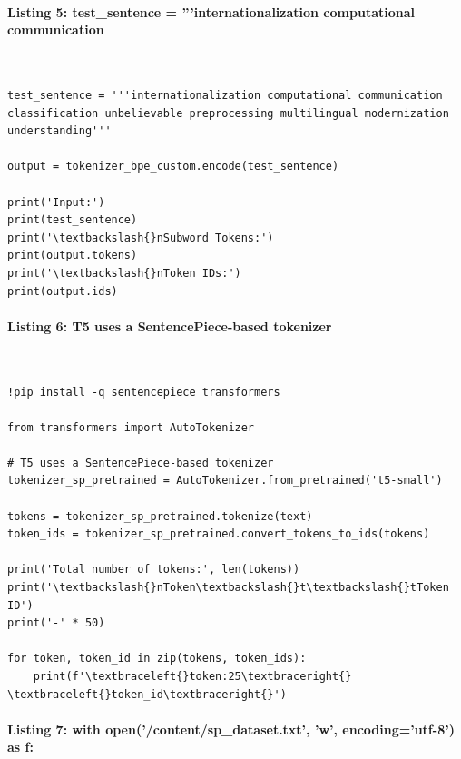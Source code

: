 \documentclass[12pt,a4paper,oneside]{report}
\begin{document}
\paragraph{Listing 5: test\_sentence = '''internationalization computational communication}\mbox{}\\[-1ex]
\begin{Verbatim}[commandchars=\\\{\},breaklines=true,breakanywhere=true,fontsize=\scriptsize,frame=leftline,framesep=2mm,rulecolor=\color{gray}]
test_sentence = '''internationalization computational communication
classification unbelievable preprocessing multilingual modernization understanding'''

output = tokenizer_bpe_custom.encode(test_sentence)

print('Input:')
print(test_sentence)
print('\textbackslash{}nSubword Tokens:')
print(output.tokens)
print('\textbackslash{}nToken IDs:')
print(output.ids)
\end{Verbatim}
\paragraph{Listing 6: T5 uses a SentencePiece-based tokenizer}\mbox{}\\[-1ex]
\begin{Verbatim}[commandchars=\\\{\},breaklines=true,breakanywhere=true,fontsize=\scriptsize,frame=leftline,framesep=2mm,rulecolor=\color{gray}]
!pip install -q sentencepiece transformers

from transformers import AutoTokenizer

# T5 uses a SentencePiece-based tokenizer
tokenizer_sp_pretrained = AutoTokenizer.from_pretrained('t5-small')

tokens = tokenizer_sp_pretrained.tokenize(text)
token_ids = tokenizer_sp_pretrained.convert_tokens_to_ids(tokens)

print('Total number of tokens:', len(tokens))
print('\textbackslash{}nToken\textbackslash{}t\textbackslash{}tToken ID')
print('-' * 50)

for token, token_id in zip(tokens, token_ids):
    print(f'\textbraceleft{}token:25\textbraceright{} \textbraceleft{}token_id\textbraceright{}')
\end{Verbatim}
\paragraph{Listing 7: with open('/content/sp\_dataset.txt', 'w', encoding='utf-8') as f:}\mbox{}\\[-1ex]
\end{document}
